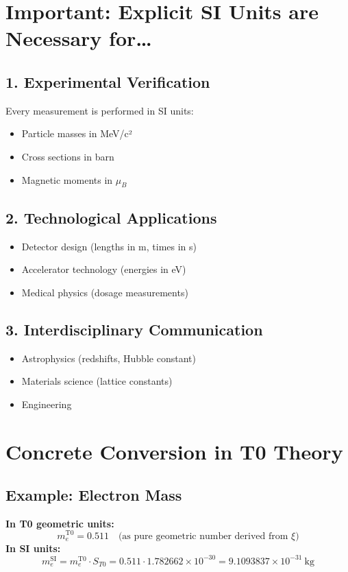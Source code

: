 \documentclass[12pt,a4paper]{article}
\begin{document}
	\section{Important: Explicit SI Units are Necessary for\dots}
	\label{sec:si-notwendig}
	
	\subsection{1. Experimental Verification}
	Every measurement is performed in SI units:
	\begin{itemize}
		\item Particle masses in MeV/c²
		\item Cross sections in barn
		\item Magnetic moments in $\mu_B$
	\end{itemize}
	
	\subsection{2. Technological Applications}
	\begin{itemize}
		\item Detector design (lengths in m, times in s)
		\item Accelerator technology (energies in eV)
		\item Medical physics (dosage measurements)
	\end{itemize}
	
	\subsection{3. Interdisciplinary Communication}
	\begin{itemize}
		\item Astrophysics (redshifts, Hubble constant)
		\item Materials science (lattice constants)
		\item Engineering
	\end{itemize}
	
	\section{Concrete Conversion in T0 Theory}
	\label{sec:umrechnung}
	
	\subsection{Example: Electron Mass}
	\textbf{In T0 geometric units:}
	\begin{equation}
		m_e^{\mathrm{T0}} = 0.511 \quad \text{(as pure geometric number derived from $\xi$)}
	\end{equation}
	\textbf{In SI units:}
	\begin{equation}
		m_e^{\mathrm{SI}} = m_e^{\mathrm{T0}} \cdot S_{T0} = 0.511 \cdot 1.782662 \times 10^{-30} = 9.1093837 \times 10^{-31}~\mathrm{kg}
	\end{equation}
	
\end{document}
